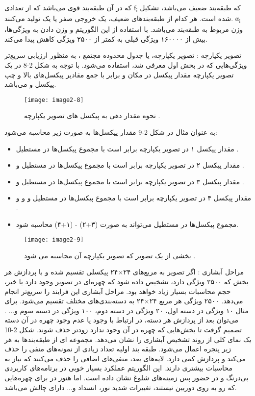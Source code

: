 \noindent
که در آن  طبقه‌بند قوی می‌باشد که از تعدادی f\textsubscript{i} که طبقه‌بند ضعیف می‌باشد، تشکیل شده است. هر کدام از طبقه‌بندهای ضعیف، یک خروجی صفر یا یک تولید می‌کنند. α\textsubscript{i} وزن مربوط به طبقه‌بند می‌باشد. با استفاده از این الگوریتم و وزن دادن به ویژگی‌ها، بیش از ۱۶۰۰۰۰ ویژگی قبلی به کمتر از ۲۵۰۰ ویژگی کاهش پیدا می‌کند.

\noindent
تصویر یکپارچه : تصویر یکپارچه، یا جدول محدوده مجتمع ، به منظور ارزيابی سريع‌تر ویژگی‌هایی که در بخش اول معرفی شد، استفاده می‌شود. با توجه به شکل 2-8 در یک تصویر یکپارچه مقدار پیکسل در مکان  و  برابر با جمع مقادیر پیکسل‌های بالا و چپ پیکسل  و  می‌باشد.

\begin{figure}[h]
\centering
  \texttt{[image: image2-8]}
  \caption{نحوه مقدار دهی به پیکسل های تصویر یکپارچه \cite{ref1}.}
  \label{image2-8}
\end{figure}

\noindent
به عنوان مثال در شکل 2-9 مقدار پیکسل‌ها به صورت زیر محاسبه می‌شود:
\begin{itemize}
\item
مقدار پیکسل ۱ در تصویر یکپارچه برابر است با مجموع پیکسل‌ها در مستطیل .
 \item
مقدار پیکسل ۲ در تصویر یکپارچه برابر است با مجموع پیکسل‌ها در مستطیل  و .
 \item
مقدار پیکسل ۳ در تصویر یکپارچه برابر است با مجموع پیکسل‌ها در مستطیل  و .
 \item
مقدار پیکسل ۴ در تصویر یکپارچه برابر است با مجموع پیکسل‌ها در مستطیل  و  و  و .
\item
مجموع پیکسل‌ها در مستطیل  می‌تواند به صورت (۳+۲) - (۱+۴) محاسبه شود.

\end{itemize} 


\begin{figure}[h]
\centering
  \texttt{[image: image2-9]}
  \caption{بخشی از یک تصویر که تصویر یکپارچه آن محاسبه می شود \cite{ref1}.}
  \label{image2-9}
\end{figure}

\noindent
مراحل آبشاری : اگر تصویر به مربع‌های ۲۴×۲۴ پیکسلی تقسیم شده و با پردازش هر بخش که ۲۵۰۰ ویژگی دارد، تشخیص داده شود که چهره‌ای در تصویر وجود دارد یا خیر، حجم محاسبات بسیار زیاد خواهد بود. مراحل آبشاری این فرایند را سریع‌تر انجام می‌دهد. ۲۵۰۰ ویژگی هر مربع ۲۴×۲۴ به دسته‌بندی‌های مختلف تقسیم می‌شود. برای مثال ۱۰ ویژگی در دسته‌ اول، ۲۰ ویژگی در دسته دوم، ۱۰۰ ویژگی در دسته سوم و... . می‌توان بعد از پردازش هر دسته، در ارتباط با وجود یا عدم وجود چهره در آن دسته تصمیم گرفت تا بخش‌هایی که چهره در آن وجود ندارد زودتر حذف شوند. شکل 2-10 یک نمای کلی از روند تشخیص آبشاری را نشان می‌دهد. مجموعه ای از طبقه‌بندها به هر زیر پنجره اعمال می‌شود. طبقه بند اولیه تعداد زیادی از نمونه‌های منفی را حذف می‌کند و پردازش کمی دارد. لایه‌های بعد، منفی‌های اضافی را حذف می‌کنند که نیاز به محاسبات بیشتری دارند. این الگوریتم عملکرد بسیار خوبی در برنامه‌های کاربردی بی‌درنگ و در حضور پس زمینه‌های شلوغ نشان داده است. اما هنوز در برای چهره‌هایی که رو به روی دوربین نیستند، تغییرات شدید نور، انسداد و... دارای چالش می‌باشد.

